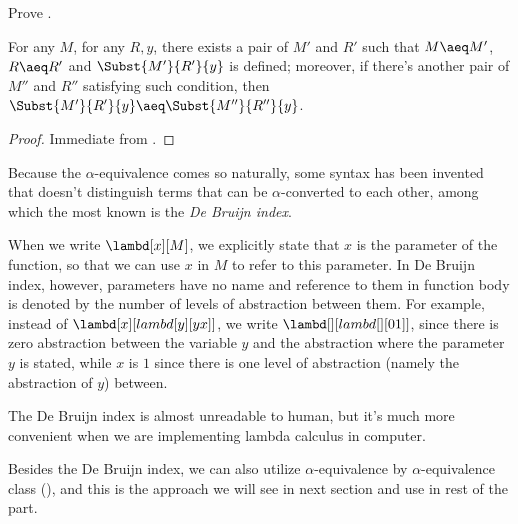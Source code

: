 \documentclass[../../../include/open-logic-section]{subfiles}
\begin{document}
\begin{prob}
  Prove .
\end{prob}

\begin{cor}
  For any $M$, for any $R, y$, there exists a pair of $M'$ and $R'$
  such that $M \aeq M'$, $R \aeq R'$ and $\Subst{M'}{R'}{y}$ is defined; moreover,
  if there's another pair of
  $M''$ and $R''$ satisfying such condition, then $\Subst{M'}{R'}{y} \aeq \Subst{M''}{R''}{y}$.
\end{cor}
\begin{proof}
  Immediate from .
\end{proof}

\begin{digress}
  Because the $\alpha$-equivalence comes so naturally, some syntax has
  been invented that doesn't distinguish terms that can be
  $\alpha$-converted to each other, among which the most known is the
  \emph{De Bruijn index}.
  
  When we write $\lambd[x][M]$, we explicitly state that $x$ is the
  parameter of the function, so that we can use $x$ in $M$ to refer
  to this parameter. In De Bruijn index, however, parameters have no
  name and reference to them in function body is denoted by the number of levels of
  abstraction between them. For example, instead of $\lambd[x][lambd[y][y
  x]]$, we write $\lambd[][lambd[][0 1]]$, since there is zero
  abstraction between the variable $y$ and the abstraction where the
  parameter $y$ is stated, while $x$ is $1$ since there is one level
  of abstraction (namely the abstraction of $y$) between.

  The De Bruijn index is almost unreadable to human, but it's
  much more convenient when we are implementing lambda calculus in
  computer.
\end{digress}

Besides the De Bruijn index, we can also utilize $\alpha$-equivalence
by $\alpha$-equivalence class (), and this is
the approach we will see in next section and use in rest of the part.
\end{document}

